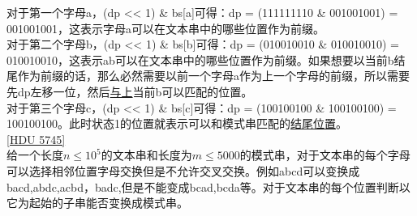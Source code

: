 对于第一个字母a，(dp << 1) \& bs[a]可得：dp = (111111110 \& 001001001) = 001001001，这表示字母a可以在文本串中的哪些位置作为前缀。 \\

对于第二个字母b，(dp << 1) \& bs[b]可得：dp = (010010010 \& 010010010) = 010010010，这表示ab可以在文本串中的哪些位置作为前缀。如果想要以当前b结尾作为前缀的话，那么必然需要以前一个字母a作为上一个字母的前缀，所以需要先dp左移一位，然后\underline{与上}当前b可以匹配的位置。\\

对于第三个字母c，(dp << 1) \& bs[c]可得：dp = (100100100 \& 100100100) = 100100100。此时状态1的位置就表示可以和模式串匹配的\underline{结尾位置}。 \\

\underline{[HDU 5745]} \\
给一个长度$n\leq 10^5$的文本串和长度为$m\leq 5000$的模式串，对于文本串的每个字母可以选择相邻位置字母交换但是不允许交叉交换。例如abcd可以变换成bacd,abdc,acbd，badc,但是不能变成bcad,bcda等。对于文本串的每个位置判断以它为起始的子串能否变换成模式串。 \\

